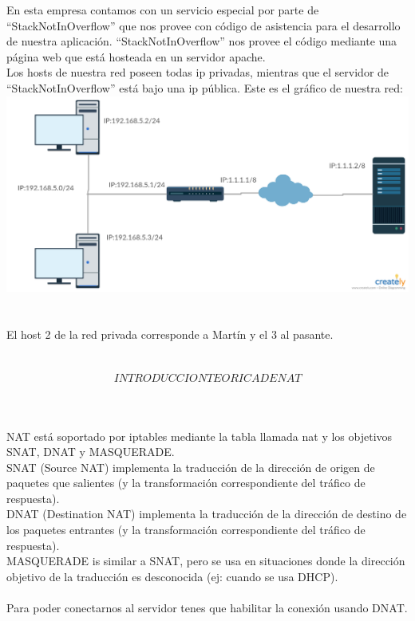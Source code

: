 \documentclass{article}
\begin{document}
En esta empresa contamos con un servicio especial por parte de “StackNotInOverflow” que nos provee con código de asistencia para el desarrollo de nuestra aplicación.  “StackNotInOverflow” nos provee el código mediante una página web que está hosteada en un servidor apache. \\
Los hosts de nuestra red poseen todas ip privadas, mientras que el servidor de “StackNotInOverflow” está bajo una ip pública.
Este es el gráfico de nuestra red:
\\
\includegraphics[width=\textwidth]{graficolab}
\\\\ \hfill \\
El host 2 de la red privada corresponde a Martín y el 3 al pasante.
\\\\ \hfill \\
\[INTRODUCCION TEORICA DE NAT\]
\\\\ \hfill \\
NAT está soportado por iptables mediante la tabla llamada nat y los objetivos SNAT, DNAT y MASQUERADE. \\
SNAT (Source NAT) implementa la traducción de la dirección de origen de paquetes que salientes (y la transformación correspondiente del tráfico de respuesta).\\
DNAT (Destination NAT) implementa la traducción de la dirección de destino de los paquetes entrantes (y la transformación correspondiente del tráfico de respuesta).\\
MASQUERADE is similar a SNAT, pero se usa en situaciones donde la dirección objetivo de la traducción es desconocida (ej: cuando se usa DHCP).\\
\\
Para poder conectarnos al servidor tenes que habilitar la conexión usando DNAT.
\end{document}
